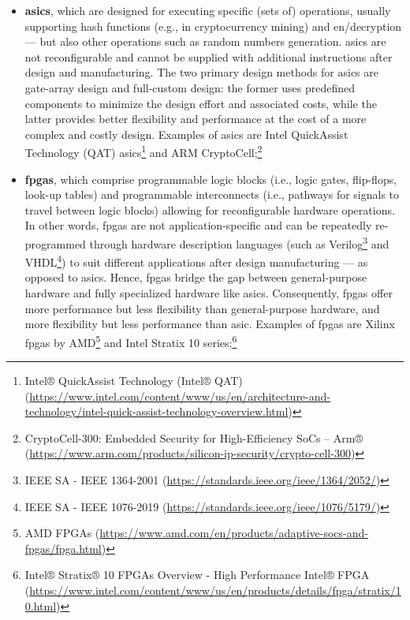 \begin{itemize}
	\item \textbf{\glspl{asic}}, which are designed for executing specific (sets of) operations, usually supporting hash functions (e.g., in cryptocurrency mining) and en/decryption --- but also other operations such as random numbers generation. \glspl{asic} are not reconfigurable and cannot be supplied with additional instructions after design and manufacturing. The two primary design methods for \glspl{asic} are gate-array design and full-custom design: the former uses predefined components to minimize the design effort and associated costs, while the latter provides better flexibility and performance at the cost of a more complex and costly design. Examples of \glspl{asic} are Intel QuickAssist Technology (QAT) \glspl{asic}\footnote{Intel® QuickAssist Technology (Intel® QAT) (\url{https://www.intel.com/content/www/us/en/architecture-and-technology/intel-quick-assist-technology-overview.html})} and ARM CryptoCell;\footnote{CryptoCell-300: Embedded Security for High-Efficiency SoCs – Arm®  (\url{https://www.arm.com/products/silicon-ip-security/crypto-cell-300})} 
	
	\item \textbf{\glspl{fpga}}, which comprise programmable logic blocks (i.e., logic gates, flip-flops, look-up tables) and programmable interconnects (i.e., pathways for signals to travel between logic blocks) allowing for reconfigurable hardware operations. In other words, \glspl{fpga} are not application-specific and can be repeatedly re-programmed through hardware description languages (such as Verilog\footnote{IEEE SA - IEEE 1364-2001 (\url{https://standards.ieee.org/ieee/1364/2052/})} and VHDL\footnote{IEEE SA - IEEE 1076-2019 (\url{https://standards.ieee.org/ieee/1076/5179/})}) to suit different applications after design manufacturing --- as opposed to \glspl{asic}. Hence, \glspl{fpga} bridge the gap between general-purpose hardware and fully specialized hardware like \glspl{asic}. Consequently, \glspl{fpga} offer more performance but less flexibility than general-purpose hardware, and more flexibility but less performance than \gls{asic}. Examples of \glspl{fpga} are Xilinx \glspl{fpga} by AMD\footnote{AMD FPGAs (\url{https://www.amd.com/en/products/adaptive-socs-and-fpgas/fpga.html})} and Intel Stratix 10 series;\footnote{Intel® Stratix® 10 FPGAs Overview - High Performance Intel® FPGA (\url{https://www.intel.com/content/www/us/en/products/details/fpga/stratix/10.html})}
	

\end{itemize}
